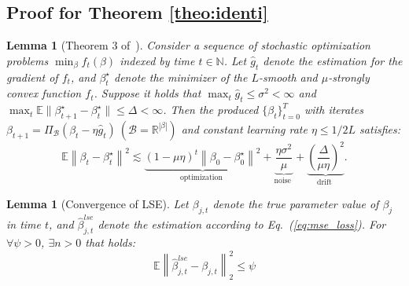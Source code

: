 \documentclass{article}
\theoremstyle{plain}
\newtheorem{lemma}[theorem]{Lemma}
\theoremstyle{definition}
\theoremstyle{remark}
\def \Eq {Eq.}
\def \sB {\mathcal{B}}
\begin{document}
\subsection{Proof for Theorem \ref{theo:identi}}
\label{prof:identi}

\begin{lemma}[Theorem 3 of~\citet{cutler2023stochastic}]
  \label{lemma:opt-bound}
  Consider a sequence of stochastic optimization problems $\min_\beta f_t(\beta)$ indexed by time $t\in\mathbb{N}$. 
  Let $\hat{g}_{t}$ denote the estimation for the gradient of $f_t$, and $\beta^\star_{t}$ denote the minimizer of the $L$-smooth and $\mu$-strongly convex function $f_t$.
  Suppose it holds that $\max_{t}\hat{g}_{t}\leq \sigma^2 < \infty$ and 
  $\max_t \mathbb{E}\|\beta^\star_{t+1} - \beta^\star_{t}\|\leq \Delta < \infty$.  
  Then the produced $\{\beta_t\}_{t=0}^T$ with iterates $\beta_{t+1} = \Pi_{\sB}(\beta_{t} - \eta \hat{g}_{t})\ (\sB=\mathbb{R}^{|\beta|})$ and constant learning rate $\eta \leq 1 / 2 L$ satisfies:
  \[
  \mathbb{E}\left\|\beta_t-\beta^\star_{t}\right\|^2 \lesssim \underbrace{(1-\mu \eta)^t\left\|\beta_0-\beta^\star_{0}\right\|^2}_{\text {optimization }}+\underbrace{\frac{\eta \sigma^2}{\mu}}_{\text {noise }}+\underbrace{\left(\frac{\Delta}{\mu \eta}\right)^2}_{\text {drift }} .
  \]
\end{lemma}


\begin{lemma}[Convergence of LSE]
  \label{lemma:lse_convergence}
  Let $\beta_{j, t}$ denote the true parameter value of $\beta_j$ in time $t$, and $\hat{\beta}^{lse}_{j, t}$ denote the estimation according to \Eq~(\ref{eq:mse_loss}). 
  For $\forall \psi > 0$, $\exists n > 0$ that holds: 
  \[
  \mathbb{E}\left\|\hat{\beta}^{lse}_{j, t} - \beta_{j, t}\right\|^2_2 \leq \psi
  \]
\end{lemma}
\end{document}
